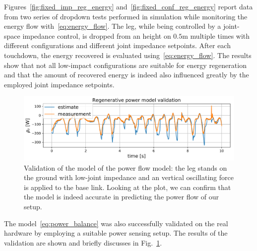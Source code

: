 Figures~\ref{fig:fixed_imp_reg_energy} and~\ref{fig:fixed_conf_reg_energy} report data from two series of dropdown tests performed in simulation while monitoring the energy flow with~\eqref{eq:energy_flow}. The leg, while being controlled by a joint-space impedance control, is dropped from an height on $0.5\mathrm{m}$ multiple times with different configurations and different joint impedance setpoints. After each touchdown, the energy recovered is evaluated using~\eqref{eq:energy_flow}. The results show that not all low-impact configurations are suitable for energy regeneration and that the amount of recovered energy is indeed also influenced greatly by the employed joint impedance setpoints. 
\begin{figure}
    \centering
    \includegraphics[width=1.0\columnwidth]{images/reg_pow_tracking.pdf}
    \caption{Validation of the model of the power flow model: the leg stands on the ground with low-joint impedance and an vertical oscillating force is applied to the base link. Looking at the plot, we can confirm that the model is indeed accurate in predicting the power flow of our setup.}
    \label{fig:reg_pow_model_tracking}
\end{figure}
The model~\eqref{eq:power_balance} was also successfully validated on the real hardware by employing a suitable power sensing setup. The results of the validation are shown and briefly discusses in Fig.~\ref{fig:reg_pow_model_tracking}. 
